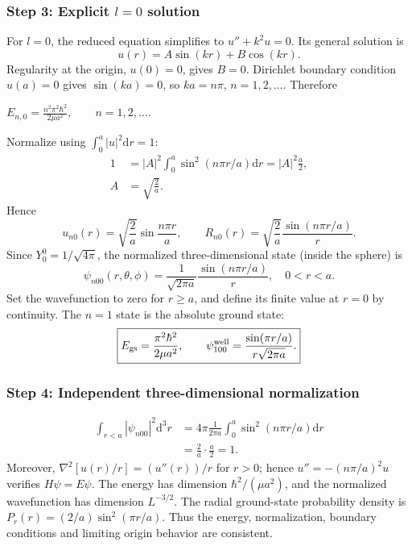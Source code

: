 \documentclass[11pt,a4paper]{article}
\newcommand{\key}[1]{\begin{resultbox}\centering\(\displaystyle #1\)\end{resultbox}}
\newcommand{\dd}{\mathrm{d}}
\begin{document}
\subsubsection*{Step 3: Explicit \(l=0\) solution}
For \(l=0\), the reduced equation simplifies to \(u''+k^2u=0\). Its general solution is
\begin{equation}u(r)=A\sin(kr)+B\cos(kr).\end{equation}
Regularity at the origin, \(u(0)=0\), gives \(B=0\). Dirichlet boundary condition \(u(a)=0\) gives \(\sin(ka)=0\), so \(ka=n\pi\), \(n=1,2,\ldots\). Therefore
\key{\boxed{E_{n,0}=\frac{n^2\pi^2\hbar^2}{2\mu a^2},\qquad n=1,2,\ldots.}}
Normalize using \(\int_0^a|u|^2\dd r=1\):
\begin{align}
1&=|A|^2\int_0^a\sin^2(n\pi r/a)\dd r=|A|^2\frac a2,\\
A&=\sqrt{\frac2a}.
\end{align}
Hence
\begin{equation}\boxed{u_{n0}(r)=\sqrt{\frac2a}\sin\frac{n\pi r}{a},\qquad R_{n0}(r)=\sqrt{\frac2a}\frac{\sin(n\pi r/a)}{r}.}\end{equation}
Since \(Y_0^0=1/\sqrt{4\pi}\), the normalized three-dimensional state (inside the sphere) is
\begin{equation}\boxed{\psi_{n00}(r,\theta,\phi)=\frac1{\sqrt{2\pi a}}\frac{\sin(n\pi r/a)}r,\quad 0<r<a.}\end{equation}
Set the wavefunction to zero for \(r\ge a\), and define its finite value at \(r=0\) by continuity. The \(n=1\) state is the absolute ground state:
\begin{equation}\boxed{E_{\mathrm{gs}}=\frac{\pi^2\hbar^2}{2\mu a^2},\qquad \psi_{100}^{\rm well}=\frac{\sin(\pi r/a)}{r\sqrt{2\pi a}}.}\end{equation}
\subsubsection*{Step 4: Independent three-dimensional normalization}
\begin{align}
\int_{r<a}|\psi_{n00}|^2\dd^3r&=4\pi\frac1{2\pi a}\int_0^a\sin^2(n\pi r/a)\dd r\\
&=\frac2a\cdot\frac a2=1.
\end{align}
Moreover, \(\nabla^2[u(r)/r]=(u''(r))/r\) for \(r>0\); hence \(u''=-(n\pi/a)^2u\) verifies \(H\psi=E\psi\). The energy has dimension \(\hbar^2/(\mu a^2)\), and the normalized wavefunction has dimension \(L^{-3/2}\). The radial ground-state probability density is \(P_r(r)=(2/a)\sin^2(\pi r/a)\). Thus the energy, normalization, boundary conditions and limiting origin behavior are consistent.
\end{document}
